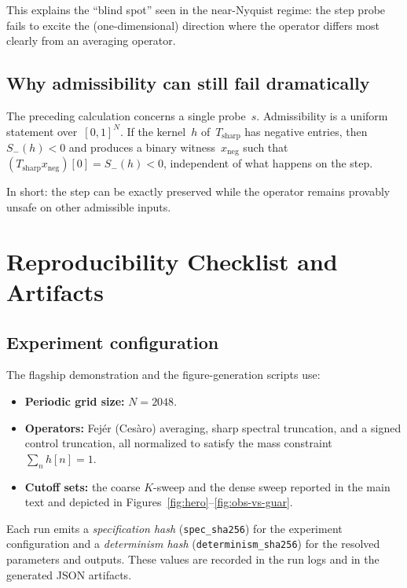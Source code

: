 \documentclass[11pt,a4paper]{article}
\theoremstyle{plain}
\theoremstyle{definition}
\theoremstyle{plain}
\newcommand{\xneg}{x_{\mathrm{neg}}}
\newcommand{\Sminus}{S_{-}}
\begin{document}
This explains the ``blind spot'' seen in the near-Nyquist regime: the step probe
fails to excite the (one-dimensional) direction where the operator differs most
clearly from an averaging operator.


\subsection{Why admissibility can still fail dramatically}
\label{app:fail-dramatically}

The preceding calculation concerns a single probe~$s$.  Admissibility is a
uniform statement over~$[0,1]^N$.  If the kernel~$h$ of~$T_{\mathrm{sharp}}$ has
negative entries, then $\Sminus(h) < 0$ and  produces a
binary witness~$\xneg$ such that
$(T_{\mathrm{sharp}} \xneg)[0] = \Sminus(h) < 0$, independent of what happens
on the step.

In short: the step can be exactly preserved while the operator remains provably
unsafe on other admissible inputs.


\section{Reproducibility Checklist and Artifacts}
\label{app:repro}

\subsection{Experiment configuration}

The flagship demonstration and the figure-generation scripts use:

\begin{itemize}[leftmargin=2em]
  \item \textbf{Periodic grid size:} $N = 2048$.
  \item \textbf{Operators:} Fej\'er (Ces\`aro) averaging, sharp spectral
    truncation, and a signed control truncation, all normalized to satisfy the
    mass constraint $\sum_n h[n] = 1$.
  \item \textbf{Cutoff sets:} the coarse $K$-sweep and the dense sweep reported
    in the main text and depicted in Figures~\ref{fig:hero}--\ref{fig:obs-vs-guar}.
\end{itemize}

Each run emits a \emph{specification hash} (\texttt{spec\_sha256}) for the
experiment configuration and a \emph{determinism hash}
(\texttt{determinism\_sha256}) for the resolved parameters and outputs.  These
values are recorded in the run logs and in the generated JSON artifacts.
\end{document}
